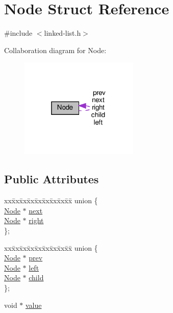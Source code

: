 \hypertarget{structNode}{}\section{Node Struct Reference}
\label{structNode}


{\ttfamily \#include $<$linked-\/list.\+h$>$}



Collaboration diagram for Node\+:
\nopagebreak
\begin{figure}[H]
\begin{center}
\leavevmode
\includegraphics[width=160pt]{structNode__coll__graph}
\end{center}
\end{figure}
\subsection*{Public Attributes}
\begin{DoxyCompactItemize}
\item 
\begin{tabbing}
xx\=xx\=xx\=xx\=xx\=xx\=xx\=xx\=xx\=\kill
union \{\\
\>\hyperlink{structNode}{Node} $\ast$ \hyperlink{structNode_a2559a716f69ccaa76d648d9f1b83065e}{next}\\
\>\hyperlink{structNode}{Node} $\ast$ \hyperlink{structNode_a7328862eaa6dea28018326549b3294d3}{right}\\
\}; \\

\end{tabbing}\item 
\begin{tabbing}
xx\=xx\=xx\=xx\=xx\=xx\=xx\=xx\=xx\=\kill
union \{\\
\>\hyperlink{structNode}{Node} $\ast$ \hyperlink{structNode_a632ea91c6a13082308f7692649a68880}{prev}\\
\>\hyperlink{structNode}{Node} $\ast$ \hyperlink{structNode_ab8c667ac8fdb120ed4c031682a9cdaee}{left}\\
\>\hyperlink{structNode}{Node} $\ast$ \hyperlink{structNode_ad55e191b2855879d7b761258d64e2667}{child}\\
\}; \\

\end{tabbing}\item 
void $\ast$ \hyperlink{structNode_a520bf86af21ca233eb9f58e9e28c6576}{value}
\end{DoxyCompactItemize}


